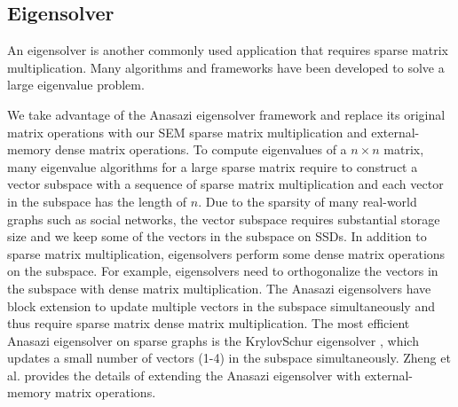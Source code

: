 
\subsection{Eigensolver}
An eigensolver is another commonly used application that requires sparse matrix
multiplication. Many algorithms \cite{Lanczos, IRLM, krylovschur} and frameworks
\cite{arpack, anasazi, slepc} have been developed to solve a large eigenvalue
problem.

We take advantage of the Anasazi eigensolver framework \cite{anasazi} and
replace its original matrix operations with our SEM sparse
matrix multiplication and external-memory dense matrix operations. To compute
eigenvalues of a $n \times n$ matrix, many eigenvalue algorithms for a large
sparse matrix require to construct a vector subspace with a sequence of
sparse matrix multiplication and each vector in the subspace has the length of $n$.
Due to the sparsity of many real-world graphs such as social networks,
the vector subspace requires substantial storage size and we keep
some of the vectors in the subspace on SSDs. In addition to sparse matrix
multiplication, eigensolvers perform some dense matrix operations on the subspace.
For example, eigensolvers need to orthogonalize the vectors in the subspace with
dense matrix multiplication. The Anasazi eigensolvers have block extension to
update multiple
vectors in the subspace simultaneously and thus require sparse matrix dense
matrix multiplication. The most efficient Anasazi eigensolver on sparse graphs
is the KrylovSchur eigensolver \cite{krylovschur}, which updates a small number
of vectors (1-4) in the subspace simultaneously. Zheng et al.
\cite{flasheigen} provides the details of extending the Anasazi eigensolver
with external-memory matrix operations.



